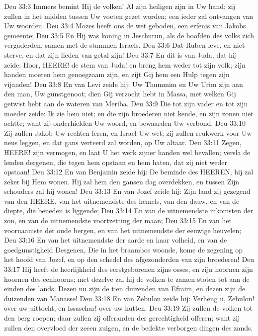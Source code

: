 Deu 33:3  Immers bemint Hij de volken! Al zijn heiligen zijn in Uw hand; zij zullen in het midden tussen Uw voeten gezet worden; een ieder zal ontvangen van Uw woorden.
Deu 33:4  Mozes heeft ons de wet geboden, een erfenis van Jakobs gemeente;
Deu 33:5  En Hij was koning in Jeschurun, als de hoofden des volks zich vergaderden, samen met de stammen Israels.
Deu 33:6  Dat Ruben leve, en niet sterve, en dat zijn lieden van getal zijn!
Deu 33:7  En dit is van Juda, dat hij zeide: Hoor, HEERE! de stem van Juda! en breng hem weder tot zijn volk; zijn handen moeten hem genoegzaam zijn, en zijt Gij hem een Hulp tegen zijn vijanden!
Deu 33:8  En van Levi zeide hij: Uw Thummim en Uw Urim zijn aan den man, Uw gunstgenoot; dien Gij verzocht hebt in Massa, met welken Gij getwist hebt aan de wateren van Meriba.
Deu 33:9  Die tot zijn vader en tot zijn moeder zeide: Ik zie hem niet; en die zijn broederen niet kende, en zijn zonen niet achtte; want zij onderhielden Uw woord, en bewaarden Uw verbond.
Deu 33:10  Zij zullen Jakob Uw rechten leren, en Israel Uw wet; zij zullen reukwerk voor Uw neus leggen, en dat gans verteerd zal worden, op Uw altaar.
Deu 33:11  Zegen, HEERE! zijn vermogen, en laat U het werk zijner handen wel bevallen; versla de lenden dergenen, die tegen hem opstaan en hem haten, dat zij niet weder opstaan!
Deu 33:12  En van Benjamin zeide hij: De beminde des HEEREN, hij zal zeker bij Hem wonen. Hij zal hem den gansen dag overdekken, en tussen Zijn schouders zal hij wonen!
Deu 33:13  En van Jozef zeide hij: Zijn land zij gezegend van den HEERE, van het uitnemendste des hemels, van den dauw, en van de diepte, die beneden is liggende;
Deu 33:14  En van de uitnemendste inkomsten der zon, en van de uitnemendste voortzetting der maan;
Deu 33:15  En van het voornaamste der oude bergen, en van het uitnemendste der eeuwige heuvelen;
Deu 33:16  En van het uitnemendste der aarde en haar volheid, en van de goedgunstigheid Desgenen, Die in het braambos woonde, kome de zegening op het hoofd van Jozef, en op den schedel des afgezonderden van zijn broederen!
Deu 33:17  Hij heeft de heerlijkheid des eerstgeborenen zijns osses, en zijn hoornen zijn hoornen des eenhoorns; met dezelve zal hij de volken te zamen stoten tot aan de einden des lands. Dezen nu zijn de tien duizenden van Efraim, en dezen zijn de duizenden van Manasse!
Deu 33:18  En van Zebulon zeide hij: Verheug u, Zebulon! over uw uittocht, en Issaschar! over uw hutten.
Deu 33:19  Zij zullen de volken tot den berg roepen; daar zullen zij offeranden der gerechtigheid offeren; want zij zullen den overvloed der zeeen zuigen, en de bedekte verborgen dingen des zands.

